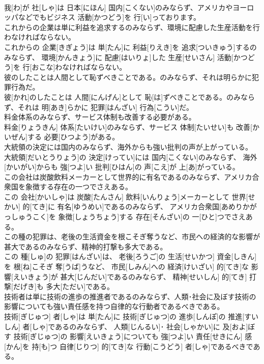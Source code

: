 \documentclass[8pt]{extreport}
\begin{document}
\begin{CJK}{UTF8}{min}
\\	我[わ]が 社[しゃ]は 日本[にほん] 国内[こくない]のみならず、アメリカやヨーロッパなどでもビジネス 活動[かつどう]を 行[い]っております。
\\	これからの企業は単に利益を追求するのみならず、環境に配慮した生産活動を行わなければならない。	
\\	これからの 企業[きぎょう]は 単[たん]に 利益[りえき]を 追求[ついきゅう]するのみならず、 環境[かんきょう]に 配慮[はいりょ]した 生産[せいさん] 活動[かつどう]を 行[おこな]わなければならない。
\\	彼のしたことは人間として恥ずべきことである。のみならず、それは明らかに犯罪行為だ。	
\\	彼[かれ]のしたことは 人間[にんげん]として 恥[は]ずべきことである。のみならず、それは 明[あき]らかに 犯罪[はんざい] 行為[こうい]だ。
\\	料金体系のみならず、サービス体制も改善する必要がある。	
\\	料金[りょうきん] 体系[たいけい]のみならず、サービス 体制[たいせい]も 改善[かいぜん]する 必要[ひつよう]がある。
\\	大統領の決定には国内のみならず、海外からも強い批判の声が上がっている。	
\\	大統領[だいとうりょう]の 決定[けってい]には 国内[こくない]のみならず、 海外[かいがい]からも 強[つよ]い 批判[ひはん]の 声[こえ]が 上[あ]がっている。
\\	この会社は炭酸飲料メーカーとして世界的に有名であるのみならず、アメリカ合衆国を象徴する存在の一つでさえある。	
\\	この 会社[かいしゃ]は 炭酸[たんさん] 飲料[いんりょう]メーカーとして 世界[せかい] 的[てき]に 有名[ゆうめい]であるのみならず、 アメリカ合衆国[あめりかがっしゅうこく]を 象徴[しょうちょう]する 存在[そんざい]の 一[ひと]つでさえある。
\\	この種の犯罪は、老後の生活資金を根こそぎ奪うなど、市民への経済的な影響が甚大であるのみならず、精神的打撃も多大である。	
\\	この 種[しゅ]の 犯罪[はんざい]は、 老後[ろうご]の 生活[せいかつ] 資金[しきん]を 根[ね]こそぎ 奪[うば]うなど、 市民[しみん]への 経済[けいざい] 的[てき]な 影響[えいきょう]が 甚大[じんだい]であるのみならず、 精神[せいしん] 的[てき] 打撃[だげき]も 多大[ただい]である。
\\	技術者は単に技術の進歩の推進者であるのみならず、人類･社会に及ぼす技術の影響についても強い責任感を持つ自律的な行動者であるべきである。	
\\	技術[ぎじゅつ] 者[しゃ]は 単[たん]に 技術[ぎじゅつ]の 進歩[しんぽ]の 推進[すいしん] 者[しゃ]であるのみならず、 人類[じんるい]･ 社会[しゃかい]に 及[およ]ぼす 技術[ぎじゅつ]の 影響[えいきょう]についても 強[つよ]い 責任[せきにん] 感[かん]を 持[も]つ 自律[じりつ] 的[てき]な 行動[こうどう] 者[しゃ]であるべきである。

\end{CJK}
\end{document}
